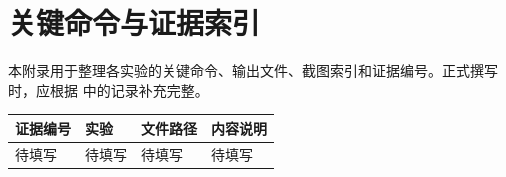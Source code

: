 \section{关键命令与证据索引}

本附录用于整理各实验的关键命令、输出文件、截图索引和证据编号。正式撰写时，应根据  中的记录补充完整。

\begin{longtable}{p{2.5cm}p{3cm}p{5cm}p{4cm}}
\toprule
证据编号 & 实验 & 文件路径 & 内容说明 \\
\midrule
待填写 & 待填写 & 待填写 & 待填写 \\
\bottomrule
\end{longtable}
